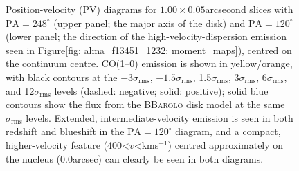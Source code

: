 \begin{figure}[!p]
    \caption[CO(1--0) position-velocity (PV) diagrams for $1.00\times0.05$\;arcsecond slices with $\mathrm{PA}=248^\circ$ and $\mathrm{PA}=120^\circ$, centred on the primary nucleus of F13451+1232.]{Position-velocity (PV) diagrams for $1.00\times0.05$\;arcsecond slices with $\mathrm{PA}=248^\circ$ (upper panel; the major axis of the disk) and $\mathrm{PA}=120^\circ$ (lower panel; the direction of the high-velocity-dispersion emission seen in Figure\;\ref{fig: alma_f13451_1232: moment_maps}), centred on the continuum centre. CO(1--0) emission is shown in yellow/orange, with black contours at the $-3\sigma_\mathrm{rms}$, $-1.5\sigma_\mathrm{rms}$, 1.5$\sigma_\mathrm{rms}$, 3$\sigma_\mathrm{rms}$, 6$\sigma_\mathrm{rms}$, and 12$\sigma_\mathrm{rms}$ levels (dashed: negative; solid: positive); solid blue contours show the flux from the \textsc{BBarolo} disk model at the same $\sigma_\mathrm{rms}$ levels. Extended, intermediate-velocity emission is seen in both redshift and blueshift in the $\mathrm{PA}=120^\circ$ diagram, and a compact, higher-velocity feature (400\;\textless\;$v$\;\textless{}\;km\;s$^{-1}$) centred approximately on the nucleus (0.0\;arcsec) can clearly be seen in both diagrams.}
    \label{fig: alma_f13451_1232: pv_diagrams}
\end{figure}


